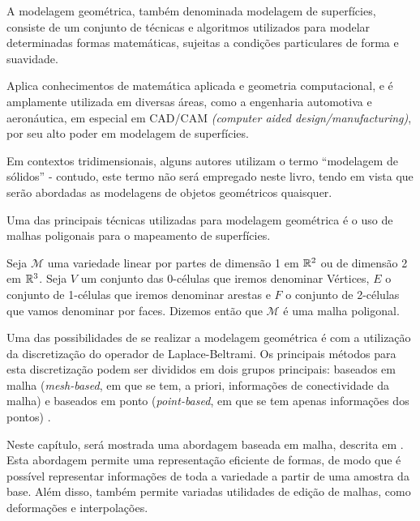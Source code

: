 A modelagem geométrica, também denominada modelagem de superfícies, consiste de um conjunto de técnicas e algoritmos utilizados para modelar determinadas formas matemáticas, sujeitas a condições particulares de forma e suavidade.

Aplica conhecimentos de matemática aplicada e geometria computacional, e é amplamente utilizada em diversas áreas, como a engenharia automotiva e aeronáutica, em especial em CAD/CAM \textit{(computer aided design/manufacturing)}, por seu alto poder em modelagem de superfícies.

Em contextos tridimensionais, alguns autores utilizam o termo ``modelagem de sólidos'' \cite{agoston2005} - contudo, este termo não será empregado neste livro, tendo em vista que serão abordadas as modelagens de objetos geométricos quaisquer.  

Uma das principais técnicas utilizadas para modelagem geométrica é o uso de malhas poligonais para o mapeamento de superfícies.

\begin{defi} 
Seja $\mathcal{M}$ uma variedade linear por partes de dimensão 1 em $\mathbb{R}^2$ ou de dimensão 2 em $\mathbb{R}^3$. Seja $V$ um conjunto das 0-células que iremos denominar Vértices, $E$ o conjunto de 1-células que iremos denominar arestas e $F$ o conjunto de 2-células que vamos denominar por faces. Dizemos então que $\mathcal{M}$ é uma malha poligonal.

\end{defi}

Uma das possibilidades de se realizar a modelagem geométrica é com a utilização da discretização do operador de Laplace-Beltrami. Os principais métodos para esta discretização podem ser divididos em dois grupos principais: baseados em malha (\textit{mesh-based}, em que se tem, a priori, informações de conectividade da malha) e baseados em ponto (\textit{point-based}, em que se tem apenas informações dos pontos) \cite{petronetto2013}.

Neste capítulo, será mostrada uma abordagem baseada em malha, descrita em \cite{sorkine2006}. Esta abordagem permite uma representação eficiente de formas, de modo que é possível representar informações de toda a variedade a partir de uma amostra da base. Além disso, também permite variadas utilidades de edição de malhas, como deformações e interpolações.
